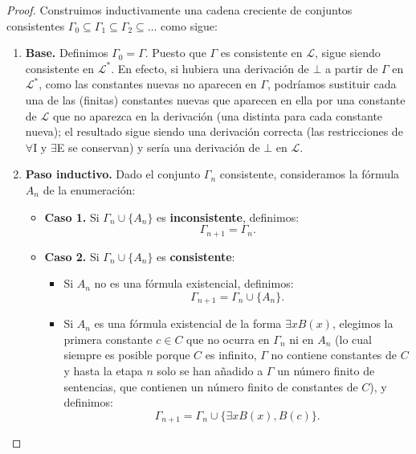 \begin{proof}
Construimos inductivamente una cadena creciente de conjuntos consistentes $\Gamma_0 \subseteq \Gamma_1 \subseteq \Gamma_2 \subseteq \dots$ como sigue:
\begin{enumerate}
    \item \textbf{Base.} Definimos $\Gamma_0 = \Gamma$. Puesto que $\Gamma$ es consistente en $\mathcal{L}$, sigue siendo consistente en $\mathcal{L}^*$. En efecto, si hubiera una derivación de $\bot$ a partir de $\Gamma$ en $\mathcal{L}^*$, como las constantes nuevas no aparecen en $\Gamma$, podríamos sustituir cada una de las (finitas) constantes nuevas que aparecen en ella por una constante de $\mathcal{L}$ que no aparezca en la derivación (una distinta para cada constante nueva); el resultado sigue siendo una derivación correcta (las restricciones de $\forall$I y $\exists$E se conservan) y sería una derivación de $\bot$ en $\mathcal{L}$.
    \item \textbf{Paso inductivo.} Dado el conjunto $\Gamma_n$ consistente, consideramos la fórmula $A_n$ de la enumeración:
    \begin{itemize}
        \item \textbf{Caso 1.} Si $\Gamma_n \cup \{A_n\}$ es \textbf{inconsistente}, definimos:
        \[
        \Gamma_{n+1} = \Gamma_n.
        \]
        \item \textbf{Caso 2.} Si $\Gamma_n \cup \{A_n\}$ es \textbf{consistente}:
        \begin{itemize}
            \item Si $A_n$ no es una fórmula existencial, definimos:
            \[
            \Gamma_{n+1} = \Gamma_n \cup \{A_n\}.
            \]
            \item Si $A_n$ es una fórmula existencial de la forma $\exists x B(x)$, elegimos la primera constante $c \in C$ que no ocurra en $\Gamma_n$ ni en $A_n$ (lo cual siempre es posible porque $C$ es infinito, $\Gamma$ no contiene constantes de $C$ y hasta la etapa $n$ solo se han añadido a $\Gamma$ un número finito de sentencias, que contienen un número finito de constantes de $C$), y definimos:
            \[
            \Gamma_{n+1} = \Gamma_n \cup \{\exists x B(x), B(c)\}.
            \]
        \end{itemize}
    \end{itemize}
\end{enumerate}


\end{proof}
